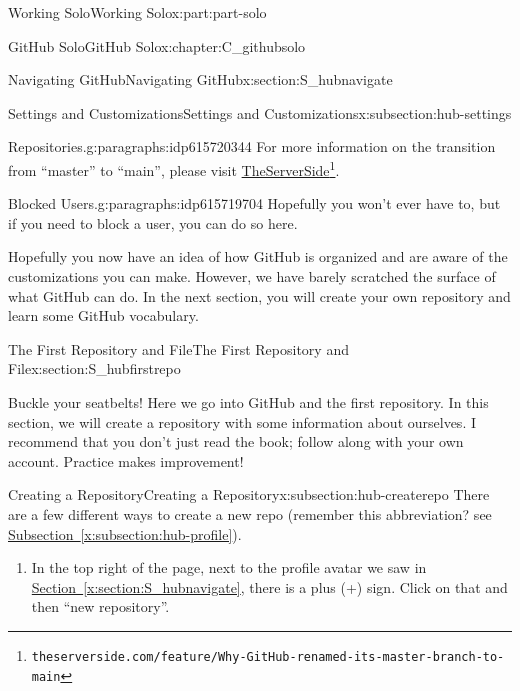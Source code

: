 \documentclass[oneside,10pt,]{book}
\newcommand{\xreffont}{\relax}
\begin{document}
\begin{partptx}{Working Solo}{}{Working Solo}{}{}{x:part:part-solo}
\begin{chapterptx}{GitHub Solo}{}{GitHub Solo}{}{}{x:chapter:C_githubsolo}
\begin{sectionptx}{Navigating GitHub}{}{Navigating GitHub}{}{}{x:section:S_hubnavigate}
\begin{subsectionptx}{Settings and Customizations}{}{Settings and Customizations}{}{}{x:subsection:hub-settings}
\begin{paragraphs}{Repositories.}{g:paragraphs:idp615720344}
For more information on the transition from ``master'' to ``main'', please visit \href{https://www.theserverside.com/feature/Why-GitHub-renamed-its-master-branch-to-main}{TheServerSide}\footnote{\nolinkurl{theserverside.com/feature/Why-GitHub-renamed-its-master-branch-to-main}\label{g:fn:idp615719192}}.%
\end{paragraphs}%
\begin{paragraphs}{Blocked Users.}{g:paragraphs:idp615719704}%
%
Hopefully you won't ever have to, but if you need to block a user, you can do so here.%
\end{paragraphs}%
\end{subsectionptx}
\begin{conclusion}{}%
Hopefully you now have an idea of how GitHub is organized and are aware of the customizations you can make. However, we have barely scratched the surface of what GitHub can do. In the next section, you will create your own repository and learn some GitHub vocabulary.%
\end{conclusion}%
\end{sectionptx}
%
%
\typeout{************************************************}
\typeout{************************************************}
%
\begin{sectionptx}{The First Repository and File}{}{The First Repository and File}{}{}{x:section:S_hubfirstrepo}
%
%
\begin{introduction}{}%
Buckle your seatbelts! Here we go into GitHub and the first repository. In this section, we will create a repository with some information about ourselves. I recommend that you don't just read the book; follow along with your own account. Practice makes improvement!%
\end{introduction}%
%
%
\typeout{************************************************}
\typeout{************************************************}
%
\begin{subsectionptx}{Creating a Repository}{}{Creating a Repository}{}{}{x:subsection:hub-createrepo}
%
There are a few different ways to create a new repo (remember this abbreviation? see \hyperref[x:subsection:hub-profile]{Subsection~{\xreffont\ref{x:subsection:hub-profile}}}).%
\begin{enumerate}
\item{}In the top right of the page, next to the profile avatar we saw in \hyperref[x:section:S_hubnavigate]{Section~{\xreffont\ref{x:section:S_hubnavigate}}}, there is a plus (+) sign. Click on that and then ``new repository''.%

\end{enumerate}
\end{subsectionptx}
\end{sectionptx}
\end{chapterptx}
\end{partptx}
\end{document}

